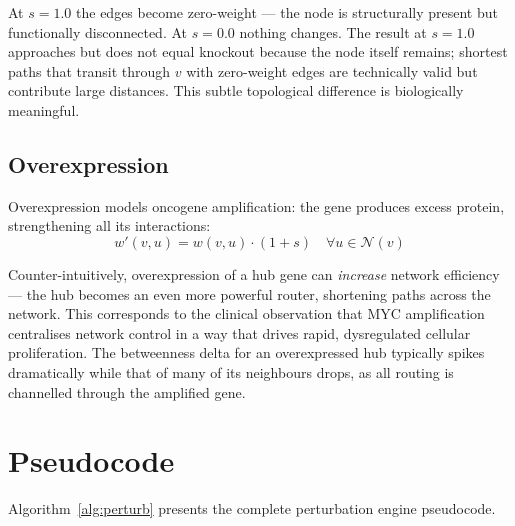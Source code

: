 \documentclass[12pt,a4paper]{report}
\begin{document}
At $s = 1.0$ the edges become zero-weight — the node is structurally present but functionally disconnected. At $s = 0.0$ nothing changes. The result at $s = 1.0$ approaches but does not equal knockout because the node itself remains; shortest paths that transit through $v$ with zero-weight edges are technically valid but contribute large distances. This subtle topological difference is biologically meaningful.

\subsection{Overexpression}

Overexpression models oncogene amplification: the gene produces excess protein, strengthening all its interactions:
\begin{equation}
  w'(v, u) = w(v, u) \cdot (1 + s) \quad \forall u \in \mathcal{N}(v)
\end{equation}

Counter-intuitively, overexpression of a hub gene can \textit{increase} network efficiency — the hub becomes an even more powerful router, shortening paths across the network. This corresponds to the clinical observation that MYC amplification centralises network control in a way that drives rapid, dysregulated cellular proliferation. The betweenness delta for an overexpressed hub typically spikes dramatically while that of many of its neighbours drops, as all routing is channelled through the amplified gene.

\section{Pseudocode}

Algorithm~\ref{alg:perturb} presents the complete perturbation engine pseudocode.
\end{document}

